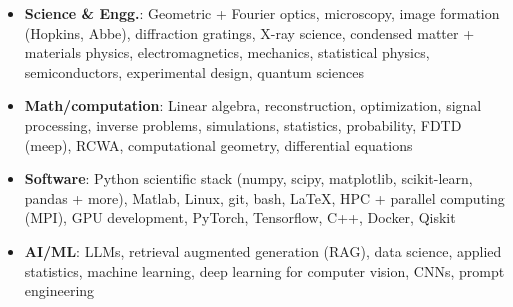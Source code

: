 \begin{itemize}
    \item \textbf{Science \& Engg.}: Geometric + Fourier optics, microscopy, image formation (Hopkins, Abbe), diffraction gratings, X-ray science, condensed matter + materials physics, electromagnetics, mechanics, statistical physics, semiconductors, experimental design, quantum sciences \par
    \item \textbf{Math/computation}: Linear algebra, reconstruction, optimization, signal processing, inverse problems, simulations, statistics, probability, FDTD (meep), RCWA, computational geometry, differential equations \par
    \item \textbf{Software}: Python scientific stack (numpy, scipy, matplotlib, scikit-learn, pandas + more), Matlab, Linux, git, bash, \LaTeX, HPC + parallel computing (MPI), GPU development, PyTorch, Tensorflow, C++, Docker, Qiskit \par
    \item\textbf{AI/ML}: LLMs, retrieval augmented generation (RAG), data science, applied statistics, machine learning, deep learning for computer vision, CNNs, prompt engineering \par
\end{itemize}

